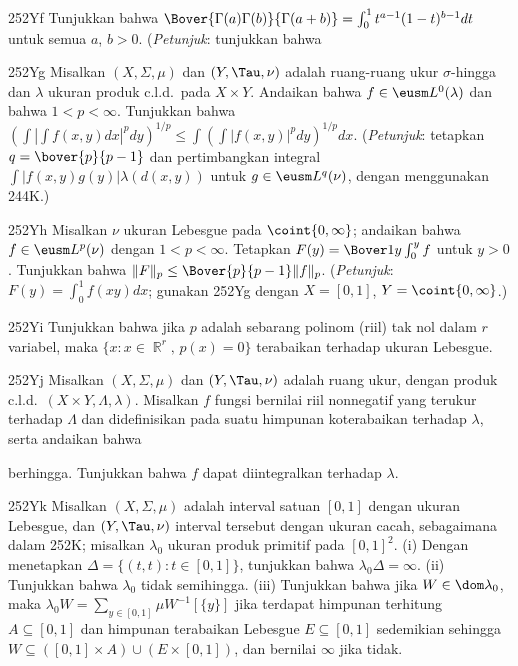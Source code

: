 {\spheader 252Yf Tunjukkan bahwa
$\Bover{\Gamma(a)\Gamma(b)}{\Gamma(a+b)}=\int_0^1t^{a-1}(1-t)^{b-1}dt$
untuk semua $a$, $b>0$. ({\it Petunjuk\/}: tunjukkan bahwa


\spheader 252Yg Misalkan $(X,\Sigma,\mu)$ dan $(Y,\Tau,\nu)$ adalah
ruang-ruang ukur $\sigma$-hingga dan $\lambda$ ukuran produk c.l.d.\ pada
$X\times Y$. Andaikan bahwa
$f\in\eusm L^0(\lambda)$ dan bahwa $1<p<\infty$. Tunjukkan bahwa
$(\int|\int f(x,y)dx|^pdy)^{1/p}\le\int(\int|f(x,y)|^pdy)^{1/p}dx$.
({\it Petunjuk\/}:
tetapkan $q=\bover{p}{p-1}$ dan pertimbangkan integral
$\int|f(x,y)g(y)|\lambda(d(x,y))$ untuk $g\in\eusm L^q(\nu)$, dengan menggunakan
244K.)

\spheader 252Yh Misalkan $\nu$ ukuran Lebesgue pada $\coint{0,\infty}$;
andaikan bahwa $f\in\eusm L^p(\nu)$ dengan $1<p<\infty$. Tetapkan
$F(y)=\Bover1y\int_0^yf$ untuk $y>0$. Tunjukkan bahwa
$\|F\|_p\le\Bover{p}{p-1}\|f\|_p$. ({\it Petunjuk\/}:
$F(y)=\int_0^1f(xy)dx$; gunakan 252Yg dengan $X=[0,1]$,
$Y=\coint{0,\infty}$.)

\spheader 252Yi Tunjukkan bahwa jika $p$ adalah sebarang polinom (riil) tak nol
dalam $r$ variabel, maka $\{x:x\in\BbbR^r,\,p(x)=0\}$ terabaikan terhadap
ukuran Lebesgue.

\spheader 252Yj Misalkan $(X,\Sigma,\mu)$ dan $(Y,\Tau,\nu)$ adalah ruang
ukur, dengan produk c.l.d.\ $(X\times Y,\Lambda,\lambda)$. Misalkan $f$ fungsi
bernilai riil nonnegatif yang terukur terhadap $\Lambda$ dan didefinisikan
pada suatu himpunan koterabaikan terhadap $\lambda$, serta andaikan bahwa


\noindent berhingga. Tunjukkan bahwa $f$ dapat diintegralkan terhadap
$\lambda$.

\spheader 252Yk Misalkan $(X,\Sigma,\mu)$ adalah interval satuan $[0,1]$
dengan ukuran Lebesgue, dan $(Y,\Tau,\nu)$ interval tersebut dengan ukuran
cacah, sebagaimana dalam 252K; misalkan $\lambda_0$ ukuran produk primitif pada
$[0,1]^2$. (i) Dengan menetapkan $\Delta=\{(t,t):t\in[0,1]\}$, tunjukkan
bahwa $\lambda_0\Delta=\infty$. (ii) Tunjukkan bahwa
$\lambda_0$ tidak semihingga. (iii) Tunjukkan bahwa jika
$W\in\dom\lambda_0$, maka
$\lambda_0W=\sum_{y\in[0,1]}\mu W^{-1}[\{y\}]$
jika terdapat himpunan terhitung $A\subseteq[0,1]$ dan himpunan terabaikan
Lebesgue $E\subseteq[0,1]$ sedemikian sehingga
$W\subseteq([0,1]\times A)\cup(E\times[0,1])$, dan bernilai $\infty$ jika tidak.

}
